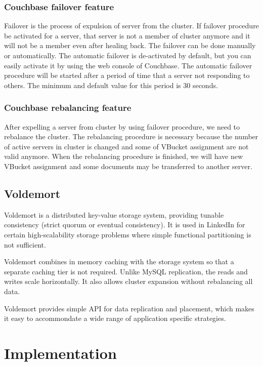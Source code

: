 \documentclass[a4paper]{article}
\begin{document}
\subsubsection*{Couchbase failover feature}
Failover is the process of expulsion of server from the cluster. 
If failover procedure be activated for a server, that server is not a member of cluster anymore and it will not be a member even after healing back. 
The failover can be done manually or automatically. 
The automatic failover is de-activated by default, but you can easily activate it by using the web console of Couchbase. 
The automatic failover procedure will be started after a period of time that a server not responding to others.
The minimum and default value for this period is 30 seconds. 

\subsubsection*{Couchbase rebalancing feature}
After expelling a server from cluster by using failover procedure, we need to rebalance the cluster. 
The rebalancing procedure is necessary because the number of active servers in cluster is changed and some of VBucket assignment are not valid anymore.
 When the rebalancing procedure is finished, we will have new VBucket assignment and some documents may be transferred to another server.


\subsection*{Voldemort}

Voldemort is a distributed key-value storage system, providing tunable consistency (strict quorum or eventual consistency). It is used in LinkedIn for certain 
high-scalability storage problems where simple functional partitioning is not sufficient. 

Voldemort combines in memory caching with the storage system so that a separate caching tier is not required. Unlike MySQL replication, the reads and writes scale horizontally. It also allows cluster expansion without rebalancing all data.

Voldemort provides simple API for data replication and placement, which makes it easy to accommondate a wide range of application specific strategies.


\section{Implementation}
\end{document}
